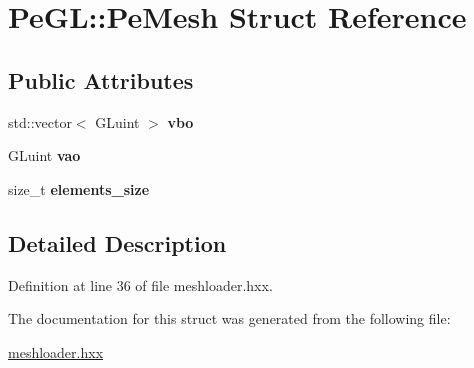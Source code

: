 \hypertarget{structPeGL_1_1PeMesh}{\section{Pe\-G\-L\-:\-:Pe\-Mesh Struct Reference}
\label{structPeGL_1_1PeMesh}
}
\subsection*{Public Attributes}
\begin{DoxyCompactItemize}
\item 
\hypertarget{structPeGL_1_1PeMesh_a04ac47a3c8f8bb828aa62a53ae78d9b8}{std\-::vector$<$ G\-Luint $>$ {\bfseries vbo}}\label{structPeGL_1_1PeMesh_a04ac47a3c8f8bb828aa62a53ae78d9b8}

\item 
\hypertarget{structPeGL_1_1PeMesh_aa3330a414cccc5540b6e92f064f4e3cd}{G\-Luint {\bfseries vao}}\label{structPeGL_1_1PeMesh_aa3330a414cccc5540b6e92f064f4e3cd}

\item 
\hypertarget{structPeGL_1_1PeMesh_a8062d6ebedf6efb5d77455a9ad403353}{size\-\_\-t {\bfseries elements\-\_\-size}}\label{structPeGL_1_1PeMesh_a8062d6ebedf6efb5d77455a9ad403353}

\end{DoxyCompactItemize}


\subsection{Detailed Description}


Definition at line 36 of file meshloader.\-hxx.



The documentation for this struct was generated from the following file\-:\begin{DoxyCompactItemize}
\item 
\hyperlink{meshloader_8hxx}{meshloader.\-hxx}\end{DoxyCompactItemize}
